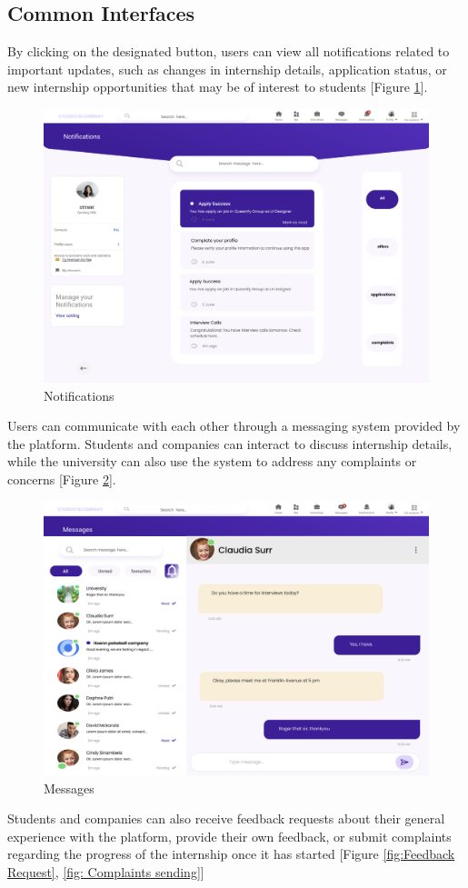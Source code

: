 \subsection{Common Interfaces}

By clicking on the designated button, users can view all notifications related to important updates, such as changes in internship details, application status, or new internship opportunities that may be of interest to students [Figure \ref{fig:Notifications}].

\begin{figure} [H]
    \centering
    \includegraphics[width=0.5\linewidth]{Interface Images/user interface/Screenshot 2024-12-12 045804.png}
    \caption{Notifications}
    \label{fig:Notifications}
\end{figure}


Users can communicate with each other through a messaging system provided by the platform. Students and companies can interact to discuss internship details, while the university can also use the system to address any complaints or concerns [Figure \ref{fig: Messages}].


\begin{figure} [H]
    \centering
    \includegraphics[width=0.5\linewidth]{Interface Images/user interface/Screenshot 2024-12-12 045915.png}
    \caption{Messages}
    \label{fig: Messages}
\end{figure}


Students and companies can also receive feedback requests about their general experience with the platform, provide their own feedback, or submit complaints regarding the progress of the internship once it has started [Figure \ref{fig:Feedback Request}, \ref{fig: Complaints sending}] 


